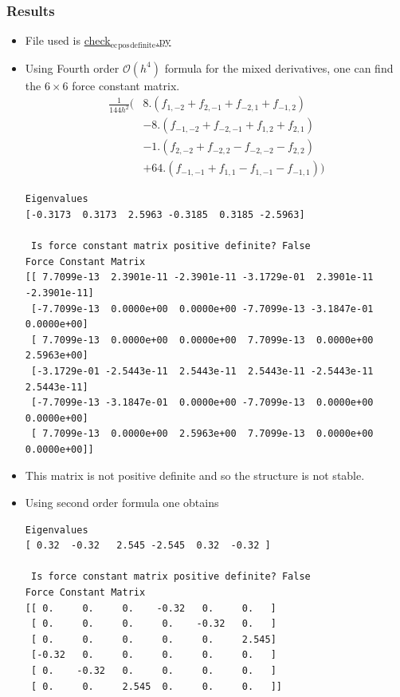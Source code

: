\documentclass[11pt]{article}
\begin{document}
\subsubsection{Results}
\label{sec-1-10-1}
\begin{itemize}
\item File used is \href{file:///home/tigany/Documents/ti/complete_titanium/ti_01-11-18/check_ec_pos_definite/check_ec_pos_definite.py}{check$_{\text{ec}}$$_{\text{pos}}$$_{\text{definite}}$.py}
\item Using Fourth order $\mathcal{O}(h^{4})$ formula for the mixed
derivatives, one can find the $6\times6$ force constant matrix.
\begin{align}
  \frac{1}{144 h^2} (     &  8.  (  f_{ 1,-2} +  f_{ 2,-1} + f_{-2, 1} + f_{-1, 2} )\\
                         &-  8.  (  f_{-1,-2} +  f_{-2,-1} + f_{ 1, 2} + f_{ 2, 1} )\\
                         &-  1.  (  f_{ 2,-2} +  f_{-2, 2} - f_{-2,-2} - f_{ 2, 2} )\\
                         &+  64. (  f_{-1,-1} +  f_{ 1, 1} - f_{ 1,-1} - f_{-1, 1} )  )
\end{align}

\begin{verbatim}
Eigenvalues
[-0.3173  0.3173  2.5963 -0.3185  0.3185 -2.5963]

 Is force constant matrix positive definite? False
Force Constant Matrix
[[ 7.7099e-13  2.3901e-11 -2.3901e-11 -3.1729e-01  2.3901e-11 -2.3901e-11]
 [-7.7099e-13  0.0000e+00  0.0000e+00 -7.7099e-13 -3.1847e-01  0.0000e+00]
 [ 7.7099e-13  0.0000e+00  0.0000e+00  7.7099e-13  0.0000e+00  2.5963e+00]
 [-3.1729e-01 -2.5443e-11  2.5443e-11  2.5443e-11 -2.5443e-11  2.5443e-11]
 [-7.7099e-13 -3.1847e-01  0.0000e+00 -7.7099e-13  0.0000e+00  0.0000e+00]
 [ 7.7099e-13  0.0000e+00  2.5963e+00  7.7099e-13  0.0000e+00  0.0000e+00]]
\end{verbatim}

\item This matrix is not positive definite and so the structure is not
stable.

\item Using second order formula one obtains
\begin{verbatim}
Eigenvalues
[ 0.32  -0.32   2.545 -2.545  0.32  -0.32 ]

 Is force constant matrix positive definite? False
Force Constant Matrix
[[ 0.     0.     0.    -0.32   0.     0.   ]
 [ 0.     0.     0.     0.    -0.32   0.   ]
 [ 0.     0.     0.     0.     0.     2.545]
 [-0.32   0.     0.     0.     0.     0.   ]
 [ 0.    -0.32   0.     0.     0.     0.   ]
 [ 0.     0.     2.545  0.     0.     0.   ]]
\end{verbatim}


\end{itemize}
\end{document}
